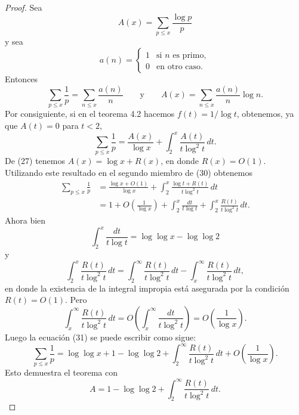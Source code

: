 \documentclass[12pt,a4paper]{book}
\begin{document}
    \begin{proof}
        Sea
        \begin{equation*}
            A(x)=\sum_{p\leq x}\frac{\log p}{p}
        \end{equation*}
        y sea
        \begin{equation*}
            a(n)=
            \begin{cases}
                1 & \text{si } n \text{ es primo},\\
                0 & \text{en otro caso.}
            \end{cases}
        \end{equation*}
        Entonces
        \begin{equation*}
            \sum_{p\leq x}\frac{1}{p}=\sum_{n\leq x}\frac{a(n)}{n}\qquad\text{y}\qquad
            A(x)=\sum_{n\leq x}\frac{a(n)}{n}\log n.
        \end{equation*}
        Por consiguiente, si en el teorema 4.2 hacemos $f(t)=1/\log t$, obtenemos, ya
        que $A(t)=0$ para $t<2$,
        \begin{equation}
            \sum_{p\leq x}\frac{1}{p}=\frac{A(x)}{\log x}+\int_2^x\frac{A(t)}{t\log^2t}\,dt.
        \end{equation}
        De (27) tenemos $A(x)=\log x+R(x)$, en donde $R(x)=O(1)$. Utilizando este
        resultado en el segundo miembro de (30) obtenemos
        \begin{align}
            \sum_{p\leq x}\frac{1}{p}&=\frac{\log x+O(1)}{\log x}+\int_2^x\frac{\log t+R(t)}{t\log^2t}\,dt\\
            &=1+O\left(\frac{1}{\log x}\right)+\int_2^x\frac{dt}{t\log t}+\int_2^x\frac{R(t)}{t\log^2t}\,dt.
        \end{align}
        Ahora bien
        \begin{equation*}
            \int_2^x\frac{dt}{t\log t}=\log\log x-\log\log2
        \end{equation*}
        y
        \begin{equation*}
            \int_2^x\frac{R(t)}{t\log^2t}\,dt=\int_2^{\infty}\frac{R(t)}{t\log^2t}\,dt
            -\int_x^{\infty}\frac{R(t)}{t\log^2t}\,dt,
        \end{equation*}
        en donde la existencia de la integral impropia está asegurada por la condición
        $R(t)=O(1)$. Pero
        \begin{equation*}
            \int_x^{\infty}\frac{R(t)}{t\log^2t}\,dt=O\left(\int_x^{\infty}\frac{dt}{t\log^2t}\right)
            =O\left(\frac{1}{\log x}\right).
        \end{equation*}
        Luego la ecuación (31) se puede escribir como sigue:
        \begin{equation*}
            \sum_{p\leq x}\frac{1}{p}=\log\log x+1-\log\log2+\int_2^{\infty}\frac{R(t)}{t\log^2t}\,dt
            +O\left(\frac{1}{\log x}\right).
        \end{equation*}
        Esto demuestra el teorema con
        \begin{equation*}
            A=1-\log\log2+\int_2^{\infty}\frac{R(t)}{t\log^2t}\,dt.
        \end{equation*}
    \end{proof}
\end{document}
